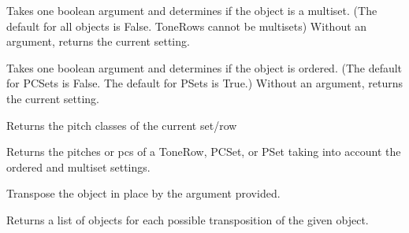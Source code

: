 \documentclass[letterpaper,10pt,english]{sphinxmanual}
\begin{document}
\begin{fulllineitems}
\begin{fulllineitems}
\label{_templates/core:core.SetRowBase.multiset}
Takes one boolean argument and determines if the object is a multiset.
(The default for all objects is False. ToneRows cannot be multisets)
Without an argument, returns the current setting.

\end{fulllineitems}


\begin{fulllineitems}
\label{_templates/core:core.SetRowBase.ordered}
Takes one boolean argument and determines if the object is ordered.
(The default for PCSets is False. The default for PSets is True.)
Without an argument, returns the current setting.

\end{fulllineitems}


\begin{fulllineitems}
\label{_templates/core:core.SetRowBase.pcs}
Returns the pitch classes of the current set/row

\end{fulllineitems}


\begin{fulllineitems}
\label{_templates/core:core.SetRowBase.ppc}
Returns the pitches or pcs of a ToneRow, PCSet, or PSet taking into
account the ordered and multiset settings.

\end{fulllineitems}


\begin{fulllineitems}
\label{_templates/core:core.SetRowBase.t}
Transpose the object in place by the argument provided.

\end{fulllineitems}


\begin{fulllineitems}
\label{_templates/core:core.SetRowBase.t_rotations}
Returns a list of objects for each possible transposition of the given
object.


\end{fulllineitems}
\end{fulllineitems}
\end{document}
